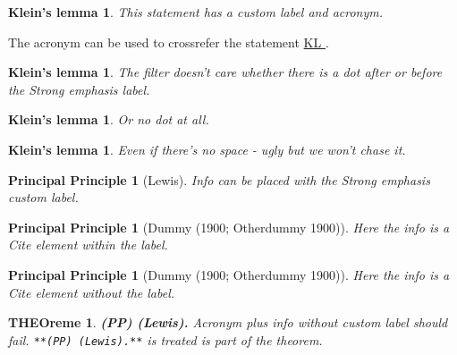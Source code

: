 \documentclass[
]{article}
\theoremstyle{plain}
\newtheorem{theorem}{THEOreme}
\theoremstyle{plain}
\theoremstyle{plain}
\newtheorem*{klein�__s_lemma-1}{Klein's lemma}
\theoremstyle{plain}
\newtheorem*{klein�__s_lemma-2}{Klein's lemma}
\theoremstyle{plain}
\newtheorem*{klein�__s_lemma-3}{Klein's lemma}
\theoremstyle{plain}
\newtheorem*{klein�__s_lemma-4}{Klein's lemma}
\theoremstyle{plain}
\newtheorem*{principal_principle}{Principal Principle}
\theoremstyle{plain}
\newtheorem*{principal_principle-1}{Principal Principle}
\theoremstyle{plain}
\newtheorem*{principal_principle-2}{Principal Principle}
\begin{document}
\begin{klein�__s_lemma-1}

\protect\hypertarget{KL}{}{}This statement has a custom label and
acronym.

\end{klein�__s_lemma-1}

The acronym can be used to crossrefer the statement
\protect\hyperlink{KL}{ KL }.

\begin{klein�__s_lemma-2}

\protect\hypertarget{KL}{}{}The filter doesn't care whether there is a
dot after or before the Strong emphasis label.

\end{klein�__s_lemma-2}

\begin{klein�__s_lemma-3}

\protect\hypertarget{KL}{}{}Or no dot at all.

\end{klein�__s_lemma-3}

\begin{klein�__s_lemma-4}

\protect\hypertarget{KL}{}{}Even if there's no space - ugly but we won't
chase it.

\end{klein�__s_lemma-4}

\begin{principal_principle}[Lewis]

\protect\hypertarget{PP}{}{}Info can be placed with the Strong emphasis
custom label.

\end{principal_principle}

\begin{principal_principle-1}[Dummy (1900; Otherdummy 1900)]

\protect\hypertarget{PP}{}{}Here the info is a Cite element within the
label.

\end{principal_principle-1}

\begin{principal_principle-2}[Dummy (1900; Otherdummy 1900)]

\protect\hypertarget{PP}{}{}Here the info is a Cite element without the
label.

\end{principal_principle-2}

\begin{theorem}

\textbf{(PP) (Lewis).} Acronym plus info without custom label should
fail. \texttt{**(PP)\ (Lewis).**} is treated is part of the theorem.

\end{theorem}
\end{document}
